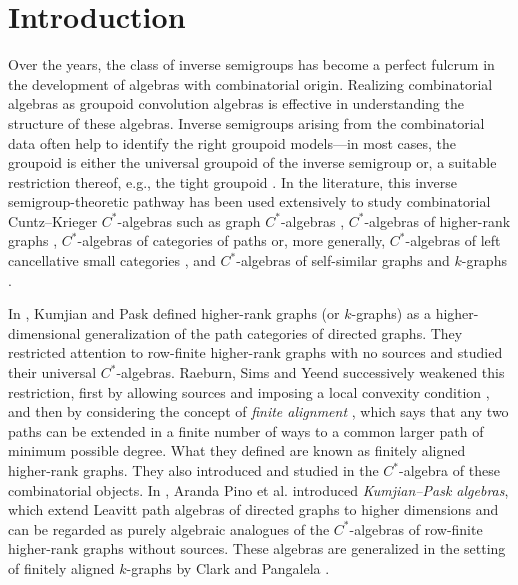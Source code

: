 \documentclass[a4paper,reqno,11pt]{amsart}
\numberwithin{equation}{section}
\theoremstyle{definition}
\theoremstyle{remark}
\begin{document}
\maketitle


\section{Introduction}\label{sec Intro}
Over the years, the class of inverse semigroups has become a perfect fulcrum in the development of algebras with combinatorial origin. Realizing combinatorial algebras as groupoid convolution algebras is effective in understanding the structure of these algebras. Inverse semigroups arising from the combinatorial data often help to identify the right groupoid models---in most cases, the groupoid is either the universal groupoid of the inverse semigroup or, a suitable restriction thereof, e.g., the tight groupoid \cite{Exel}. In the literature, this inverse semigroup-theoretic pathway has been used extensively to study combinatorial Cuntz--Krieger $C^*$-algebras such as graph $C^*$-algebras \cite{Paterson}, $C^*$-algebras of higher-rank graphs \cite{Farthing}, $C^*$-algebras of categories of paths \cite{Spielberg, Milan} or, more generally, $C^*$-algebras of left cancellative small categories \cite{LCSC, Ortega}, and $C^*$-algebras of self-similar graphs and $k$-graphs \cite{Pardo, Larki}.   

In \cite{Kumjian-Pask}, Kumjian and Pask defined higher-rank graphs (or $k$-graphs) as a higher-dimensional generalization of the path categories of directed graphs. They restricted attention to row-finite higher-rank graphs with no sources and studied their universal $C^*$-algebras. Raeburn, Sims and Yeend successively weakened this restriction, first by allowing sources and imposing a local convexity condition \cite{Raeburn}, and then by considering the concept of \emph{finite alignment} \cite{Yeend}, which says that any two paths can be extended in a finite number of ways to a common larger path of minimum possible degree. What they defined are known as finitely aligned higher-rank graphs. They also introduced and studied in \cite{Yeend} the $C^*$-algebra of these combinatorial objects. In \cite{Pino}, Aranda Pino et al. introduced \emph{Kumjian--Pask algebras}, which extend Leavitt path algebras of directed graphs \cite{Abrams} to higher dimensions and can be regarded as purely algebraic analogues of the $C^*$-algebras of row-finite higher-rank graphs without sources. These algebras are generalized in the setting of finitely aligned $k$-graphs by Clark and Pangalela \cite{Clark}.   
\end{document}
